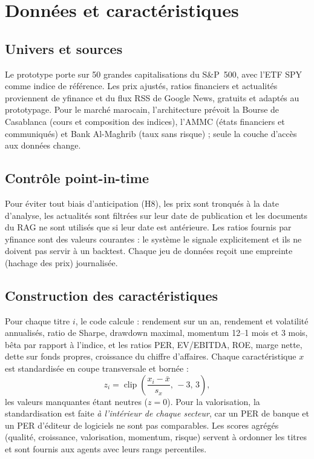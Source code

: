 \documentclass[11pt,a4paper]{report}
\begin{document}
\chapter{Données et caractéristiques}\label{ch:donnees}

\section{Univers et sources}
Le prototype porte sur 50 grandes capitalisations du S\&P~500, avec l'ETF SPY comme indice de référence.
Les prix ajustés, ratios financiers et actualités proviennent de yfinance et du flux RSS de Google News, gratuits
et adaptés au prototypage. Pour le marché marocain, l'architecture prévoit la Bourse de Casablanca (cours et
composition des indices), l'AMMC (états financiers et communiqués) et Bank Al-Maghrib (taux sans risque) ;
seule la couche d'accès aux données change.

\section{Contrôle point-in-time}
Pour éviter tout biais d'anticipation (H8), les prix sont tronqués à la date d'analyse, les actualités sont filtrées
sur leur date de publication et les documents du RAG ne sont utilisés que si leur date est antérieure.
Les ratios fournis par yfinance sont des valeurs courantes : le système le signale explicitement et ils ne doivent
pas servir à un backtest. Chaque jeu de données reçoit une empreinte (hachage des prix) journalisée.

\section{Construction des caractéristiques}
Pour chaque titre $i$, le code calcule : rendement sur un an, rendement et volatilité annualisés, ratio de Sharpe,
drawdown maximal, momentum 12--1 mois et 3 mois, bêta par rapport à l'indice, et les ratios PER, EV/EBITDA,
ROE, marge nette, dette sur fonds propres, croissance du chiffre d'affaires. Chaque caractéristique $x$ est
standardisée en coupe transversale et bornée :
\begin{equation}
  z_i = \operatorname{clip}\!\left(\frac{x_i - \bar x}{s_x},\,-3,\,3\right),
\end{equation}
les valeurs manquantes étant neutres ($z=0$). Pour la valorisation, la standardisation est faite
\emph{à l'intérieur de chaque secteur}, car un PER de banque et un PER d'éditeur de logiciels ne sont pas comparables.
Les scores agrégés (qualité, croissance, valorisation, momentum, risque) servent à ordonner les titres et sont
fournis aux agents avec leurs rangs percentiles.
\end{document}
